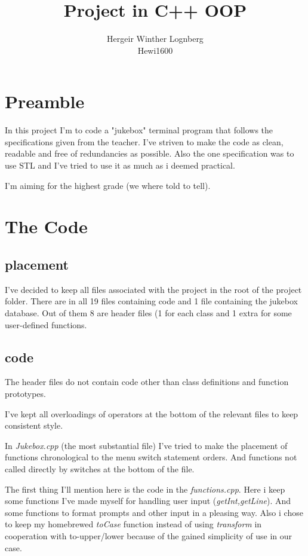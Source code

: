 \documentclass[11pt]{article}
\title{\textbf{Project in C++ OOP}}
\author{Hergeir Winther Lognberg \\
Hewi1600}
\date{}
\begin{document}
\maketitle

\section{Preamble}

In this project I'm to code a "jukebox" terminal program that follows the specifications given from the teacher.
I've striven to make the code as clean, readable and free of redundancies as possible. Also the one specification was to use STL and I've tried to use it as much as i deemed practical. 

I'm aiming for the highest grade (we where told to tell).

\section{The Code}

\subsection{placement}
I've decided to keep all files associated with the project in the root of the project folder. There are in all 19 files containing code and 1 file containing the jukebox database. Out of them 8 are header files (1 for each class and 1 extra for some user-defined functions. 

\subsection{code}
The header files do not contain code other than class definitions and function prototypes. 

I've kept all overloadings of operators at the bottom of the relevant files to keep consistent style.

In \emph{Jukebox.cpp} (the most substantial file) I've tried to make the placement of functions chronological to the menu switch statement orders. And functions not called directly by switches at the bottom of the file. 


The first thing I'll mention here is the code in the \emph{functions.cpp}. Here i keep some functions I've made myself for handling user input (\emph{getInt,getLine}). And some functions to format prompts and other input in a pleasing way.
Also i chose to keep my homebrewed \emph{toCase} function instead of using \emph{transform} in cooperation with to-upper/lower because of the gained simplicity of use in our case.
\end{document}
